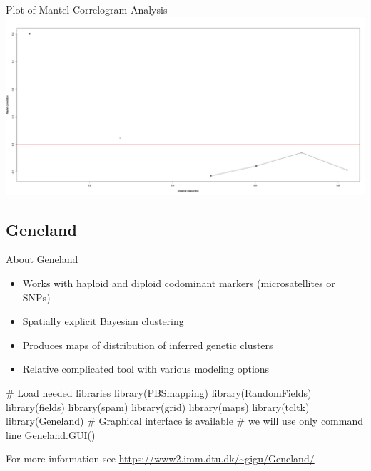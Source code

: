 \documentclass[compress, ucs, xelatex, 11pt, xcolor=svgnames,
  hyperref={
    bookmarks=true,
    unicode=true,
    colorlinks=true,
    pdftitle={Molecular data in R},
    plainpages=false,
    pdfauthor={Vojtech Zeisek},
    pdfsubject={Course about phylogeny and evolution in R},
    pdfcreator={XeLaTeX},
    pdfkeywords={R, evolution, phylogeny, molecular data},
    linkcolor=Tomato,
    anchorcolor=SaddleBrown,
    citecolor=Goldenrod,
    filecolor=DarkMagenta,
    menucolor=Sienna,
    urlcolor=DarkTurquoise,
    pdftex},
  url={hyphens, lowtilde} %
  ]{beamer}
\begin{document}
\begin{frame}{Plot of Mantel Correlogram Analysis}
  \includegraphics[width=\textwidth]{mantel-cor.png}
\end{frame}

\subsection{Geneland}

\begin{frame}[fragile]{About Geneland}
\begin{multicols}{2}
\begin{itemize}
 \item Works with haploid and diploid codominant markers (microsatellites or SNPs)
 \item Spatially explicit Bayesian clustering
 \item Produces maps of distribution of inferred genetic clusters
 \item Relative complicated tool with various modeling options
\end{itemize}
  \columnbreak
  \begin{spluscode}
    # Load needed libraries
    library(PBSmapping)
    library(RandomFields)
    library(fields)
    library(spam)
    library(grid)
    library(maps)
    library(tcltk)
    library(Geneland)
    # Graphical interface is available
    # we will use only command line
    Geneland.GUI()
  \end{spluscode}
\end{multicols}
For more information see \url{https://www2.imm.dtu.dk/~gigu/Geneland/}
\end{frame}
\end{document}
